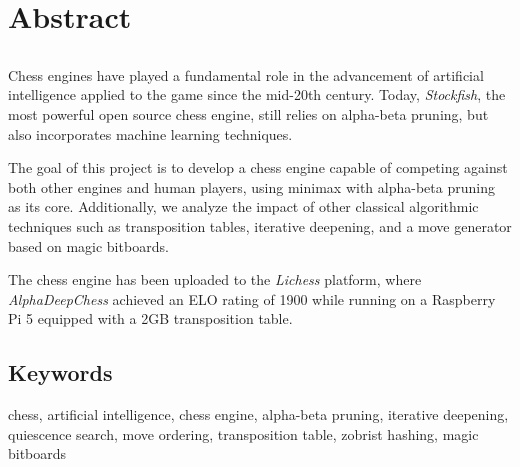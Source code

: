\chapter*{Abstract}

\section*{\tituloPortadaEngVal}

Chess engines have played a fundamental role in the advancement of artificial intelligence applied to the game since the mid-20th century. Today, \textit{Stockfish}, the most powerful open source chess engine, still relies on alpha-beta pruning, but also incorporates machine learning techniques.

\vspace{1em}

\noindent The goal of this project is to develop a chess engine capable of competing against both other engines and human players, using minimax with alpha-beta pruning as its core. Additionally, we analyze the impact of other classical algorithmic techniques such as transposition tables, iterative deepening, and a move generator based on magic bitboards.

\vspace{1em}

The chess engine has been uploaded to the \textit{Lichess} platform, where \textit{AlphaDeepChess} achieved an ELO rating of 1900 while running on a Raspberry Pi 5 equipped with a 2GB transposition table.

\section*{Keywords}

\noindent chess, artificial intelligence, chess engine, alpha-beta pruning, iterative deepening, quiescence search, move ordering, transposition table, zobrist hashing, magic bitboards
